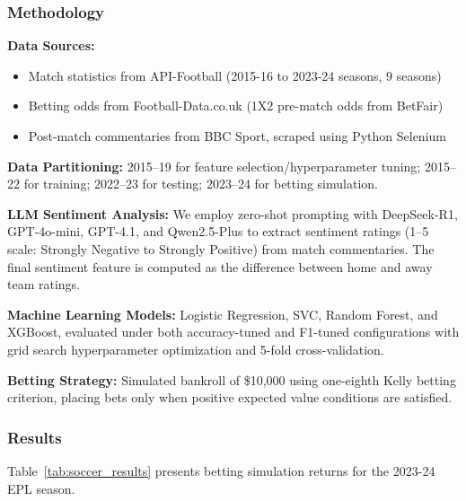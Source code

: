 \subsubsection{Methodology}

\textbf{Data Sources:}
\begin{itemize}[leftmargin=*]
    \item Match statistics from API-Football (2015-16 to 2023-24 seasons, 9 seasons)
    \item Betting odds from Football-Data.co.uk (1X2 pre-match odds from BetFair)
    \item Post-match commentaries from BBC Sport, scraped using Python Selenium
\end{itemize}

\textbf{Data Partitioning:} 2015--19 for feature selection/hyperparameter tuning; 2015--22 for training; 2022--23 for testing; 2023--24 for betting simulation.

\textbf{LLM Sentiment Analysis:} We employ zero-shot prompting with DeepSeek-R1, GPT-4o-mini, GPT-4.1, and Qwen2.5-Plus to extract sentiment ratings (1--5 scale: Strongly Negative to Strongly Positive) from match commentaries. The final sentiment feature is computed as the difference between home and away team ratings.

\textbf{Machine Learning Models:} Logistic Regression, SVC, Random Forest, and XGBoost, evaluated under both accuracy-tuned and F1-tuned configurations with grid search hyperparameter optimization and 5-fold cross-validation.

\textbf{Betting Strategy:} Simulated bankroll of \$10,000 using one-eighth Kelly betting criterion, placing bets only when positive expected value conditions are satisfied.

\subsubsection{Results}

Table~\ref{tab:soccer_results} presents betting simulation returns for the 2023-24 EPL season.

